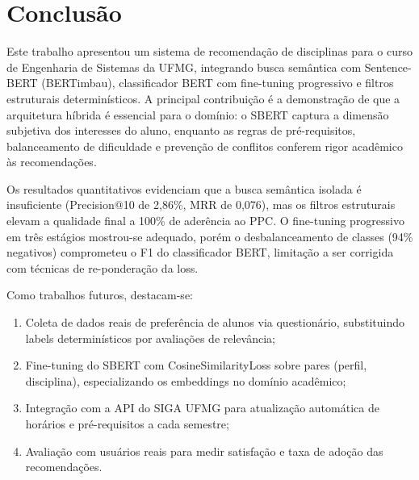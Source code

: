 \documentclass[12pt,a4paper]{article}
\begin{document}
\section{Conclusão}

Este trabalho apresentou um sistema de recomendação de disciplinas para o curso de Engenharia de Sistemas da UFMG, integrando busca semântica com Sentence-BERT (BERTimbau), classificador BERT com fine-tuning progressivo e filtros estruturais determinísticos. A principal contribuição é a demonstração de que a arquitetura híbrida é essencial para o domínio: o SBERT captura a dimensão subjetiva dos interesses do aluno, enquanto as regras de pré-requisitos, balanceamento de dificuldade e prevenção de conflitos conferem rigor acadêmico às recomendações.

Os resultados quantitativos evidenciam que a busca semântica isolada é insuficiente (Precision@10 de 2,86\%, MRR de 0,076), mas os filtros estruturais elevam a qualidade final a 100\% de aderência ao PPC. O fine-tuning progressivo em três estágios mostrou-se adequado, porém o desbalanceamento de classes (94\% negativos) comprometeu o F1 do classificador BERT, limitação a ser corrigida com técnicas de re-ponderação da loss.

Como trabalhos futuros, destacam-se:
\begin{enumerate}
    \item Coleta de dados reais de preferência de alunos via questionário, substituindo labels determinísticos por avaliações de relevância;
    \item Fine-tuning do SBERT com CosineSimilarityLoss sobre pares (perfil, disciplina), especializando os embeddings no domínio acadêmico;
    \item Integração com a API do SIGA UFMG para atualização automática de horários e pré-requisitos a cada semestre;
    \item Avaliação com usuários reais para medir satisfação e taxa de adoção das recomendações.
\end{enumerate}
\end{document}

